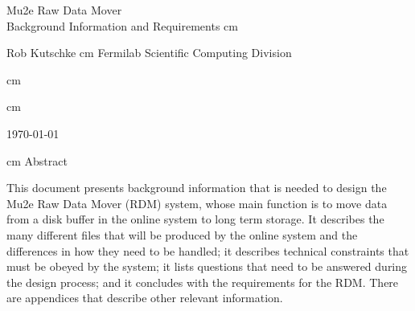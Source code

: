 %
\begin{center}
  {\Huge Mu2e Raw Data Mover} \\
  {\Huge Background Information and Requirements}
   cm

  Rob Kutschke
 cm
Fermilab Scientific Computing Division

 cm


%

%

 cm

\today

 cm
Abstract
\end{center}
\medskip

This document presents background information
that is needed to design the Mu2e Raw Data Mover (RDM) system,
whose main function is to move data from a disk buffer
in the online system to long term storage.
It describes the many different files that will be produced by the online system
and the differences in how they need to be handled;
it describes technical constraints that must be obeyed by the system;
it lists questions that need to be answered during the design process;
and it concludes with the requirements for the RDM.
There are appendices
that describe other relevant information.
\clearpage
